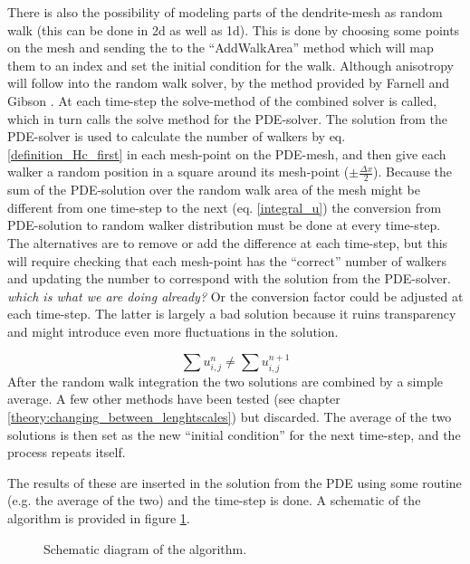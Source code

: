There is also the possibility of modeling parts of the dendrite-mesh as random walk (this can be done in 2d as well as 1d). 
This is done by choosing some points on the mesh and sending the to the ``AddWalkArea'' method which will map them to an index and set the initial condition for the walk. 
Although anisotropy will follow into the random walk solver, by the method provided by Farnell and Gibson \cite{farnell2005monte}. 
At each time-step the solve-method of the combined solver is called, which in turn calls the solve method for the PDE-solver. 
The solution from the PDE-solver is used to calculate the number of walkers by eq. \ref{definition_Hc_first} in each mesh-point on the PDE-mesh, and then give each walker a random position in a square around its mesh-point ($\pm \frac{\Delta x}{2}$). 
Because the sum of the PDE-solution over the random walk area of the mesh might be different from one time-step to the next (eq. \ref{integral_u}) the conversion from PDE-solution to random walker distribution must be done at every time-step. 
The alternatives are to remove or add the difference at each time-step, but this will require checking that each mesh-point has the ``correct'' number of walkers and updating the number to correspond with the solution from the PDE-solver. \emph{which is what we are doing already?}
Or the conversion factor could be adjusted at each time-step. The latter is largely a bad solution because it ruins transparency and might introduce even more fluctuations in the solution.

\begin{equation}\label{integral_u}
 \sum u_{i,j}^n \neq \sum u_{i,j}^{n+1}
\end{equation}
After the random walk integration the two solutions are combined by a simple average. A few other methods have been tested (see chapter \ref{theory:changing_between_lenghtscales}) but discarded. 
The average of the two solutions is then set as the new ``initial condition'' for the next time-step, and the  process repeats itself.

The results of these are inserted in the solution from the PDE using some routine (e.g. the average of the two) and the time-step is done. 
A schematic of the algorithm is provided in figure \ref{schematic}.

\begin{figure}[H]
\centering
\caption[Algorithm]{Schematic diagram of the algorithm.}
\label{schematic}
\end{figure}

